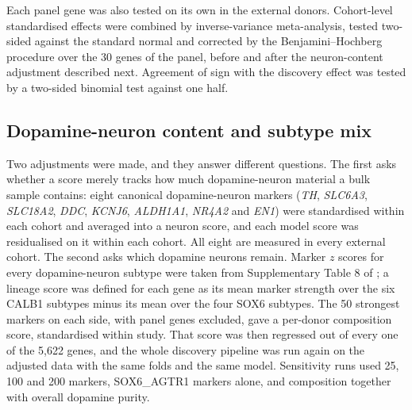 \documentclass[11pt,a4paper]{article}
\begin{document}
Each panel gene was also tested on its own in the external donors. Cohort-level standardised effects were
combined by inverse-variance meta-analysis, tested two-sided against the standard normal and corrected by the
Benjamini--Hochberg procedure over the 30 genes of the panel, before and after the neuron-content adjustment
described next. Agreement of sign with the discovery effect was tested by a two-sided binomial test against
one half.

\subsection{Dopamine-neuron content and subtype mix}

Two adjustments were made, and they answer different questions. The first asks whether a score merely tracks
how much dopamine-neuron material a bulk sample contains: eight canonical dopamine-neuron markers
(\textit{TH}, \textit{SLC6A3}, \textit{SLC18A2}, \textit{DDC}, \textit{KCNJ6}, \textit{ALDH1A1},
\textit{NR4A2} and \textit{EN1}) were standardised within each cohort and averaged into a
neuron score, and each model score was residualised on it within each cohort. All eight are measured in every
external cohort. The second asks which dopamine
neurons remain. Marker $z$ scores for every dopamine-neuron subtype were taken from Supplementary Table 8 of
\citet{kamath2022}; a lineage score was defined for each gene as its mean marker strength over the six CALB1
subtypes minus its mean over the four SOX6 subtypes. The 50 strongest markers on each side, with panel genes
excluded, gave a per-donor composition score, standardised within study. That score was then regressed out of
every one of the 5,622 genes, and the whole discovery pipeline was run again on the adjusted data with the
same folds and the same model. Sensitivity runs used 25, 100 and 200 markers, SOX6\_AGTR1 markers alone, and
composition together with overall dopamine purity.
\end{document}
